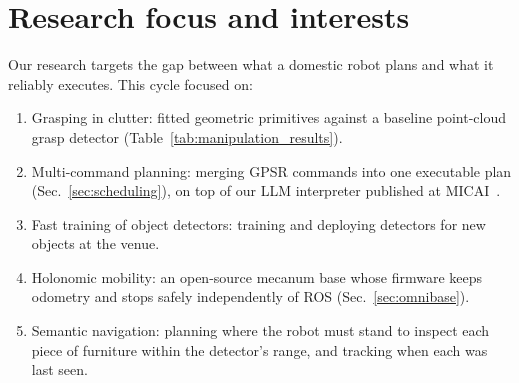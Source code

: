 \section{Research focus and interests}
Our research targets the gap between what a domestic robot plans and what it reliably executes. This cycle focused on:
\begin{enumerate}
\item Grasping in clutter: fitted geometric primitives against a baseline point-cloud grasp detector (Table~\ref{tab:manipulation_results}).
\item Multi-command planning: merging GPSR commands into one executable plan (Sec.~\ref{sec:scheduling}), on top of our LLM interpreter published at MICAI~\cite{10.1007/978-3-032-09037-9_24}.
\item Fast training of object detectors: training and deploying detectors for new objects at the venue.
\item Holonomic mobility: an open-source mecanum base whose firmware keeps odometry and stops safely independently of ROS (Sec.~\ref{sec:omnibase}).
\item Semantic navigation: planning where the robot must stand to inspect each piece of furniture within the detector's range, and tracking when each was last seen. 
\end{enumerate}